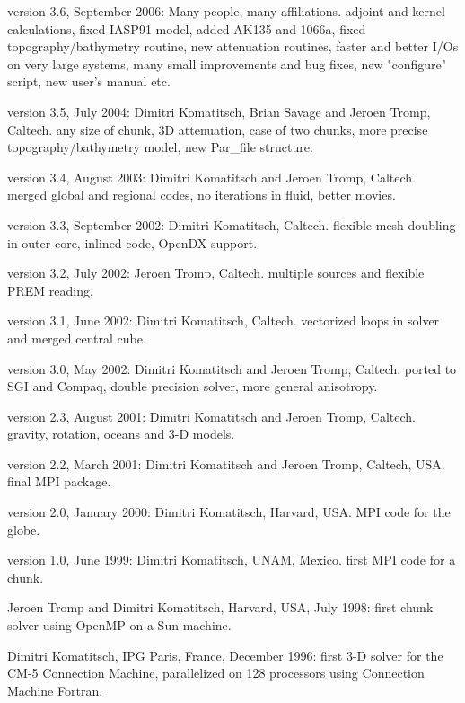  version 3.6, September 2006:
   Many people, many affiliations.
     adjoint and kernel calculations, fixed IASP91 model,
     added AK135 and 1066a, fixed topography/bathymetry routine,
     new attenuation routines, faster and better I/Os on very large
     systems, many small improvements and bug fixes, new "configure"
     script, new user's manual etc.\newline

 version 3.5, July 2004:
   Dimitri Komatitsch, Brian Savage and Jeroen Tromp, Caltech.
     any size of chunk, 3D attenuation, case of two chunks,
     more precise topography/bathymetry model, new Par\_file structure.\newline

 version 3.4, August 2003:
   Dimitri Komatitsch and Jeroen Tromp, Caltech.
     merged global and regional codes, no iterations in fluid, better movies.\newline

 version 3.3, September 2002:
   Dimitri Komatitsch, Caltech.
     flexible mesh doubling in outer core, inlined code, OpenDX support.\newline

 version 3.2, July 2002:
   Jeroen Tromp, Caltech.
     multiple sources and flexible PREM reading.\newline

 version 3.1, June 2002:
   Dimitri Komatitsch, Caltech.
     vectorized loops in solver and merged central cube.\newline

 version 3.0, May 2002:
   Dimitri Komatitsch and Jeroen Tromp, Caltech.
     ported to SGI and Compaq, double precision solver, more general anisotropy.\newline

 version 2.3, August 2001:
   Dimitri Komatitsch and Jeroen Tromp, Caltech.
     gravity, rotation, oceans and 3-D models.\newline

 version 2.2, March 2001:
   Dimitri Komatitsch and Jeroen Tromp, Caltech, USA.
     final MPI package.\newline

 version 2.0, January 2000:
   Dimitri Komatitsch, Harvard, USA.
     MPI code for the globe.\newline

 version 1.0, June 1999:
   Dimitri Komatitsch, UNAM, Mexico.
     first MPI code for a chunk.\newline

 Jeroen Tromp and Dimitri Komatitsch, Harvard, USA, July 1998: first chunk solver using OpenMP on a Sun machine.\newline

 Dimitri Komatitsch, IPG Paris, France, December 1996: first 3-D solver for the CM-5 Connection Machine,
    parallelized on 128 processors using Connection Machine Fortran.\newline

